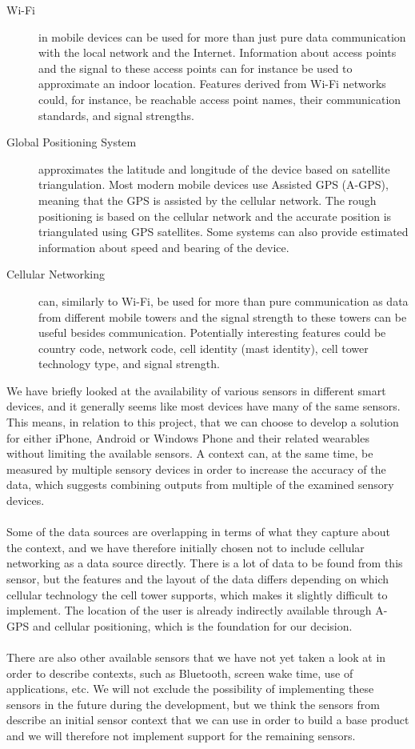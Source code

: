 \begin{description}
    \item[Wi-Fi] in mobile devices can be used for more than just pure data communication with the local network and the Internet. Information about access points and the signal to these access points can for instance be used to approximate an indoor location. Features derived from Wi-Fi networks could, for instance, be reachable access point names, their communication standards, and signal strengths. 
\end{description}
\newpage
\begin{description}
    \item[Global Positioning System] approximates the latitude and longitude of the device based on satellite triangulation. Most modern mobile devices use Assisted GPS (A-GPS), meaning that the GPS is assisted by the cellular network. The rough positioning is based on the cellular network and the accurate position is triangulated using GPS satellites. Some systems can also provide estimated information about speed and bearing of the device.
    \item[Cellular Networking] can, similarly to Wi-Fi, be used for more than pure communication as data from different mobile towers and the signal strength to these towers can be useful besides communication. Potentially interesting features could be country code, network code, cell identity (mast identity), cell tower technology type, and signal strength.
\end{description}

We have briefly looked at the availability of various sensors in different smart devices, and it generally seems like most devices have many of the same sensors. This means, in relation to this project, that we can choose to develop a solution for either iPhone, Android or Windows Phone and their related wearables without limiting the available sensors. A context can, at the same time, be measured by multiple sensory devices in order to increase the accuracy of the data, which suggests combining outputs from multiple of the examined sensory devices. 
\\\\
Some of the data sources are overlapping in terms of what they capture about the context, and we have therefore initially chosen not to include cellular networking as a data source directly. There is a lot of data to be found from this sensor, but the features and the layout of the data differs depending on which cellular technology the cell tower supports, which makes it slightly difficult to implement. The location of the user is already indirectly available through A-GPS and cellular positioning, which is the foundation for our decision.
\\\\
There are also other available sensors that we have not yet taken a look at in order to describe contexts, such as Bluetooth, screen wake time, use of applications, etc. We will not exclude the possibility of implementing these sensors in the future during the development, but we think the sensors from  describe an initial sensor context that we can use in order to build a base product and we will therefore not implement support for the remaining sensors.